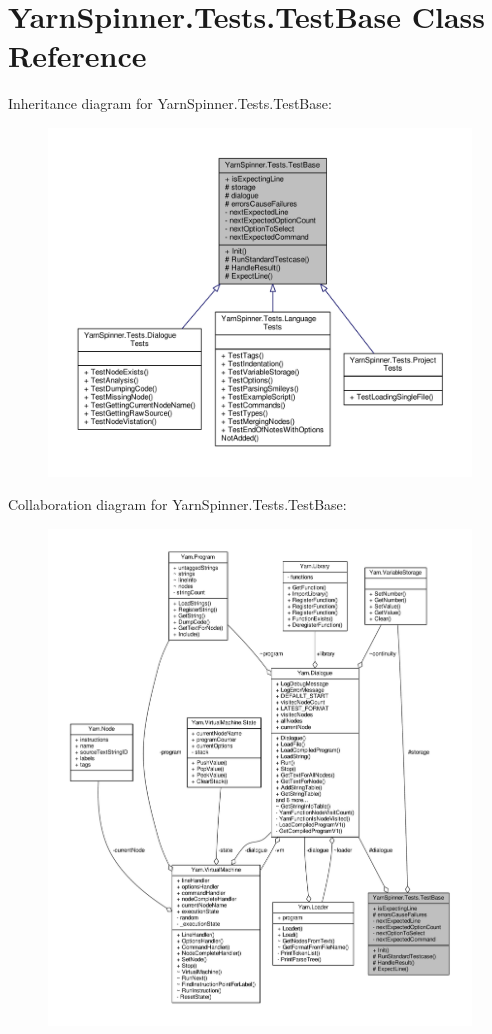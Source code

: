 \hypertarget{a00144}{\section{Yarn\-Spinner.\-Tests.\-Test\-Base Class Reference}
\label{a00144}
}


Inheritance diagram for Yarn\-Spinner.\-Tests.\-Test\-Base\-:
\nopagebreak
\begin{figure}[H]
\begin{center}
\leavevmode
\includegraphics[width=350pt]{d1/da6/a00738}
\end{center}
\end{figure}


Collaboration diagram for Yarn\-Spinner.\-Tests.\-Test\-Base\-:
\nopagebreak
\begin{figure}[H]
\begin{center}
\leavevmode
\includegraphics[width=350pt]{da/df7/a00739}
\end{center}
\end{figure}
